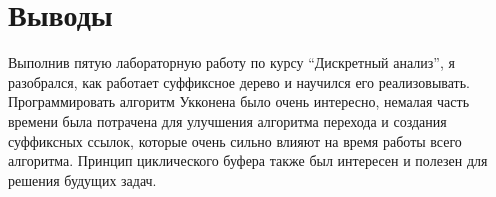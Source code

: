 \section{Выводы}
Выполнив пятую лабораторную работу по курсу \enquote{Дискретный анализ}, я разобрался, как работает суффиксное дерево и научился его реализовывать. Программировать алгоритм Укконена было очень интересно, немалая часть времени была потрачена для улучшения алгоритма перехода и создания суффиксных ссылок, которые очень сильно влияют на время работы всего алгоритма. Принцип циклического буфера также был интересен и полезен для решения будущих задач.
\pagebreak
